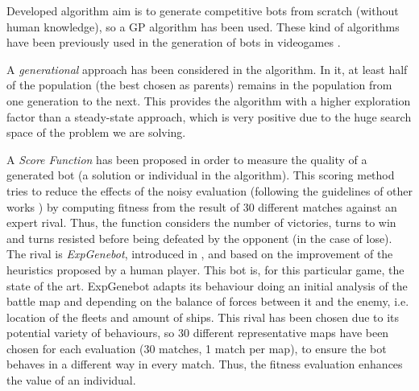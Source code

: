 \documentclass[runningheads,a4paper]{llncs}
\begin{document}

Developed algorithm aim is to generate competitive bots from scratch (without human knowledge), so a GP algorithm has been used. These kind of algorithms have been previously used in the generation of bots in videogames \cite{Esparcia2013GPunreal,Harper2014403}. 

A \textit{generational} approach has been considered in the algorithm. 
In it, at least half of the population (the best chosen as parents)
remains in the population from one generation to the next. This provides the algorithm with a higher exploration factor than a steady-state approach, which is very positive due to the huge search space of the problem we are solving.


A \textit{Score Function} has been proposed in order to measure the quality of a generated bot (a solution or individual in the algorithm). This scoring method tries to reduce the effects of the noisy evaluation (following the guidelines of other works \cite{DBLP:journals/jcst/MoraFGGF12}) by computing fitness from the result of 30 different matches against an expert rival.
Thus, the function considers the number of victories, turns to win and turns resisted before being defeated by the opponent (in the case of lose). The rival is \textit{ExpGenebot}, introduced in
\cite{DBLP:conf/cig/Fernandez-AresGMG12}, and based on the improvement of the heuristics proposed by a human player. This bot is, for this particular game, the state of the art. ExpGenebot adapts its behaviour doing an initial analysis
of the battle map and depending on the balance of forces between it and the enemy, i.e. location of the fleets and amount of ships.
This rival has been chosen due to its potential variety of behaviours,
so 30 different representative maps have been chosen for each
evaluation (30 matches, 1 match per map), to ensure the bot behaves in a different way in every match. Thus, the fitness evaluation enhances the value of an individual. 
\end{document}
